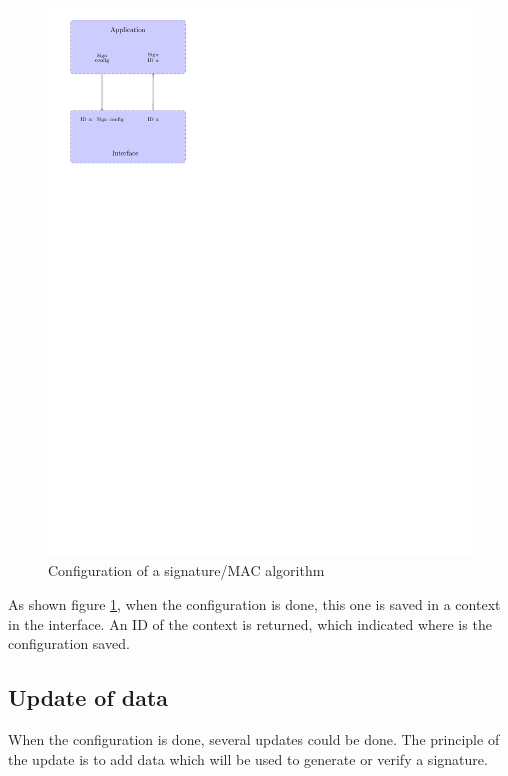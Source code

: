 \begin{figure}[!ht]
\centering
\includegraphics[trim=0cm 20cm 13.5cm 0cm]{figures/sign_example_config.pdf}
\caption{Configuration of a signature/MAC algorithm}
\label{fig:gci_sign_config}
\end{figure}

As shown figure \ref{fig:gci_sign_config}, when the configuration is done, this
one is saved in a context in the interface. An ID of the context is returned,
which indicated where is the configuration saved.

\subsection*{Update of data} 

When the configuration is done, several updates could be done.\newline
The principle of the update is to add data which will be used to generate or
verify a signature.\newline

